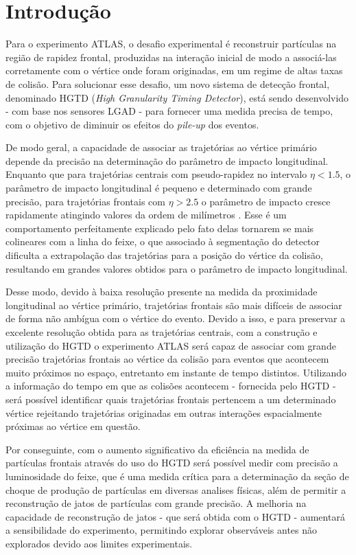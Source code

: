 \chapter{Introdução}

Para o experimento ATLAS, o desafio experimental é reconstruir partículas na região de rapidez frontal, produzidas na interação inicial de modo a associá-las corretamente com o vértice onde foram originadas, em um regime de altas taxas de colisão. Para solucionar esse desafio, um novo sistema de detecção frontal, denominado HGTD ({\it High Granularity Timing Detector}), está sendo desenvolvido - com base nos sensores LGAD - para fornecer uma medida precisa de tempo, com o objetivo de diminuir os efeitos do {\it pile-up} dos eventos. 

De modo geral, a capacidade de associar as trajetórias ao vértice primário depende da precisão na determinação do parâmetro de impacto longitudinal. Enquanto que para trajetórias centrais com pseudo-rapidez no intervalo $\eta<1.5$, o parâmetro de impacto longitudinal é pequeno e determinado com grande precisão, para trajetórias frontais com $\eta>2.5$ o parâmetro de impacto cresce rapidamente atingindo valores da ordem de milímetros \cite{tdr}. Esse é um comportamento perfeitamente explicado pelo fato delas tornarem se mais colineares com a linha do feixe, o que associado à segmentação do detector dificulta a extrapolação das trajetórias para a posição do vértice da colisão, resultando em grandes valores obtidos para o parâmetro de impacto longitudinal.

Desse modo, devido à baixa resolução presente na medida da proximidade longitudinal ao vértice primário, trajetórias frontais são mais difíceis de associar de forma não ambígua com o vértice do evento. Devido a isso, e para preservar a excelente resolução obtida para as trajetórias centrais, com a construção e utilização do HGTD o experimento ATLAS será capaz de associar com grande precisão trajetórias frontais ao vértice da colisão para eventos que acontecem muito próximos no espaço, entretanto em instante de tempo distintos. Utilizando a informação do tempo em que as colisões acontecem - fornecida pelo HGTD - será possível identificar quais trajetórias frontais pertencem a um determinado vértice rejeitando trajetórias originadas em outras interações espacialmente próximas ao vértice em questão. 

Por conseguinte, com o aumento significativo da eficiência na medida de partículas frontais através do uso do HGTD será possível medir com precisão a luminosidade do feixe, que é uma medida crítica para a determinação da seção de choque de produção de partículas em diversas analises físicas, além de  permitir a reconstrução de jatos de partículas com grande precisão. A melhoria na capacidade de reconstrução de jatos - que será obtida com o HGTD - aumentará a sensibilidade do experimento, permitindo explorar observáveis antes não explorados devido aos limites experimentais.

